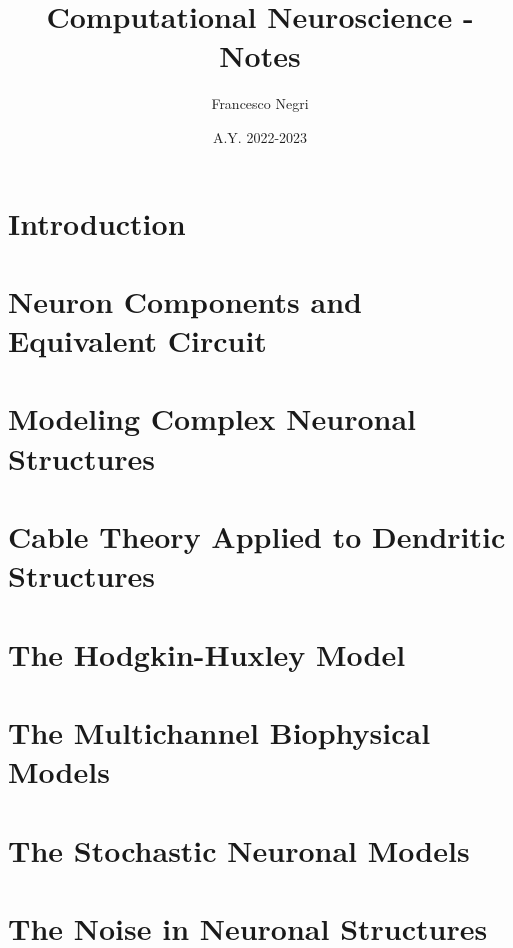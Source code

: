 \documentclass[12pt]{article}
\title{Computational Neuroscience - Notes}
\author{Francesco Negri}
\date{A.Y. 2022-2023}
\begin{document}
\maketitle

\tableofcontents
\newpage

\section{Introduction}
\graphicspath{ {./images/01/} }

\newpage

\section{Neuron Components and Equivalent Circuit}
\graphicspath{ {./images/02/} }

\newpage

\section{Modeling Complex Neuronal Structures}
\graphicspath{ {./images/03/} }

\newpage

\section{Cable Theory Applied to Dendritic Structures}
\graphicspath{ {./images/04/} }

\newpage

\section{The Hodgkin-Huxley Model}
\graphicspath{ {./images/05/} }

\newpage

\section{The Multichannel Biophysical Models}
\graphicspath{ {./images/06/} }

\newpage

\section{The Stochastic Neuronal Models}
\graphicspath{ {./images/07/} }

\newpage

\section{The Noise in Neuronal Structures}
\graphicspath{ {./images/08/} }

\newpage
\end{document}
